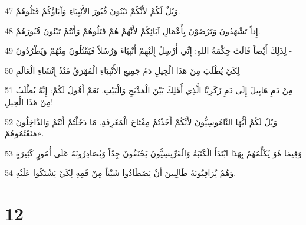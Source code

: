 \par 47 وَيْلٌ لَكُمْ لأَنَّكُمْ تَبْنُونَ قُبُورَ الأَنْبِيَاءِ وَآبَاؤُكُمْ قَتَلُوهُمْ.
\par 48 إِذاً تَشْهَدُونَ وَتَرْضَوْنَ بِأَعْمَالِ آبَائِكُمْ لأَنَّهُمْ هُمْ قَتَلُوهُمْ وَأَنْتُمْ تَبْنُونَ قُبُورَهُمْ.
\par 49 لِذَلِكَ أَيْضاً قَالَتْ حِكْمَةُ اللهِ: إِنِّي أُرْسِلُ إِلَيْهِمْ أَنْبِيَاءَ وَرُسُلاً فَيَقْتُلُونَ مِنْهُمْ وَيَطْرُدُونَ -
\par 50 لِكَيْ يُطْلَبَ مِنْ هَذَا الْجِيلِ دَمُ جَمِيعِ الأَنْبِيَاءِ الْمُهْرَقُ مُنْذُ إِنْشَاءِ الْعَالَمِ
\par 51 مِنْ دَمِ هَابِيلَ إِلَى دَمِ زَكَرِيَّا الَّذِي أُهْلِكَ بَيْنَ الْمَذْبَحِ وَالْبَيْتِ. نَعَمْ أَقُولُ لَكُمْ: إِنَّهُ يُطْلَبُ مِنْ هَذَا الْجِيلِ!
\par 52 وَيْلٌ لَكُمْ أَيُّهَا النَّامُوسِيُّونَ لأَنَّكُمْ أَخَذْتُمْ مِفْتَاحَ الْمَعْرِفَةِ. مَا دَخَلْتُمْ أَنْتُمْ وَالدَّاخِلُونَ مَنَعْتُمُوهُمْ».
\par 53 وَفِيمَا هُوَ يُكَلِّمُهُمْ بِهَذَا ابْتَدَأَ الْكَتَبَةُ وَالْفَرِّيسِيُّونَ يَحْنَقُونَ جِدّاً وَيُصَادِرُونَهُ عَلَى أُمُورٍ كَثِيرَةٍ
\par 54 وَهُمْ يُرَاقِبُونَهُ طَالِبِينَ أَنْ يَصْطَادُوا شَيْئاً مِنْ فَمِهِ لِكَيْ يَشْتَكُوا عَلَيْهِ.

\chapter{12}

